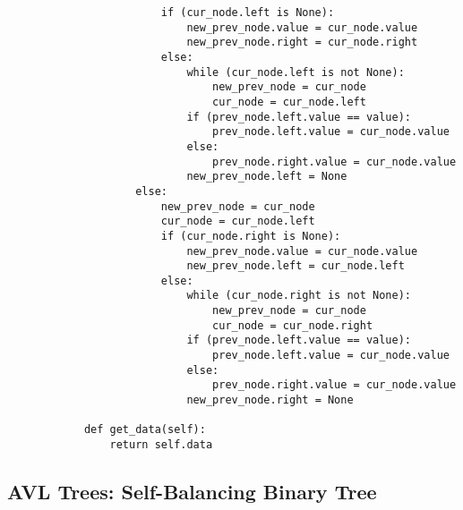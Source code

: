 \begin{lstlisting}
                        if (cur_node.left is None):
                            new_prev_node.value = cur_node.value
                            new_prev_node.right = cur_node.right
                        else:                                        
                            while (cur_node.left is not None):
                                new_prev_node = cur_node
                                cur_node = cur_node.left
                            if (prev_node.left.value == value):
                                prev_node.left.value = cur_node.value
                            else:
                                prev_node.right.value = cur_node.value
                            new_prev_node.left = None
                    else:
                        new_prev_node = cur_node
                        cur_node = cur_node.left
                        if (cur_node.right is None):
                            new_prev_node.value = cur_node.value
                            new_prev_node.left = cur_node.left
                        else:                                        
                            while (cur_node.right is not None):
                                new_prev_node = cur_node
                                cur_node = cur_node.right
                            if (prev_node.left.value == value):
                                prev_node.left.value = cur_node.value
                            else:
                                prev_node.right.value = cur_node.value
                            new_prev_node.right = None

            def get_data(self):
                return self.data
    \end{lstlisting}





\subsection{ AVL Trees: Self-Balancing Binary Tree }

